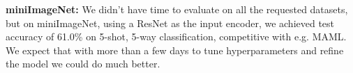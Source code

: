 \documentclass{article}
\begin{document}
{}
\textbf{miniImageNet:} We didn't have time to evaluate on all the requested datasets, but on miniImageNet, using a ResNet as the input encoder, we achieved test accuracy of 61.0\% on 5-shot, 5-way classification, competitive with e.g. MAML. We expect that with more than a few days to tune hyperparameters and refine the model we could do much better. \par
\end{document}
